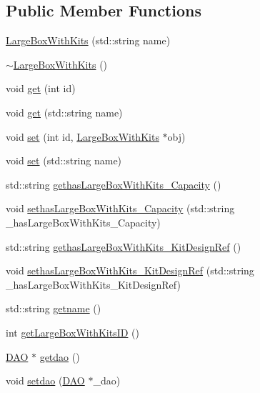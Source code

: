 \subsection*{Public Member Functions}
\begin{DoxyCompactItemize}
\item 
\hyperlink{class_large_box_with_kits_a4ebcce15e312ff0c3893e4647836d7a2}{LargeBoxWithKits} (std::string name)
\item 
\hyperlink{class_large_box_with_kits_ac557b257ed666093f1e28483c1e2baf6}{$\sim$LargeBoxWithKits} ()
\item 
void \hyperlink{class_large_box_with_kits_a6c812ecedde42bdd783a8d69ff8ffbf4}{get} (int id)
\item 
void \hyperlink{class_large_box_with_kits_a34913d976cf733ddd6bcce7b2a69f2f0}{get} (std::string name)
\item 
void \hyperlink{class_large_box_with_kits_ab7e7a2ed82830aa06a8099dd5bffca13}{set} (int id, \hyperlink{class_large_box_with_kits}{LargeBoxWithKits} $\ast$obj)
\item 
void \hyperlink{class_large_box_with_kits_a35a63e438e5acea4931ddbfba6654eb6}{set} (std::string name)
\item 
std::string \hyperlink{class_large_box_with_kits_aac50d27af9000e58058720235ffb536a}{gethasLargeBoxWithKits\_\-Capacity} ()
\item 
void \hyperlink{class_large_box_with_kits_a1a7347a290206c78f4b4f749f677b430}{sethasLargeBoxWithKits\_\-Capacity} (std::string \_\-hasLargeBoxWithKits\_\-Capacity)
\item 
std::string \hyperlink{class_large_box_with_kits_a7f511479f066a0f60a84cd20e6e6e063}{gethasLargeBoxWithKits\_\-KitDesignRef} ()
\item 
void \hyperlink{class_large_box_with_kits_a7c8a8bb0c1f09d4913515e93bd286030}{sethasLargeBoxWithKits\_\-KitDesignRef} (std::string \_\-hasLargeBoxWithKits\_\-KitDesignRef)
\item 
std::string \hyperlink{class_large_box_with_kits_a4e2846c64a39596e4ee1f4daf8eb231f}{getname} ()
\item 
int \hyperlink{class_large_box_with_kits_aaaccdd30be274a291b87d5165fef736f}{getLargeBoxWithKitsID} ()
\item 
\hyperlink{class_d_a_o}{DAO} $\ast$ \hyperlink{class_large_box_with_kits_ad9cc36f3fda8c8e85d2ab6684b4e0721}{getdao} ()
\item 
void \hyperlink{class_large_box_with_kits_a574ad43e9071234bec61d48150e7be95}{setdao} (\hyperlink{class_d_a_o}{DAO} $\ast$\_\-dao)

\end{DoxyCompactItemize}
